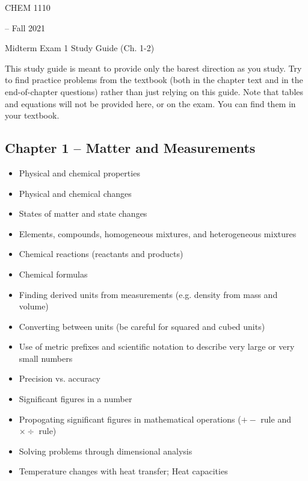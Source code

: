 \documentclass[12pt, letterpaper]{memoir}
\begin{document}
	\mainmatter
	
	\begin{center}
		{\Huge CHEM 1110}
		{\LARGE-- Fall 2021
		
		Midterm Exam 1 Study Guide (Ch. 1-2)}
	\end{center}
	
	This study guide is meant to provide only the barest direction as you study. Try to find practice problems from the textbook (both in the chapter text and in the end-of-chapter questions) rather than just relying on this guide. Note that tables and equations will not be provided here, or on the exam. You can find them in your textbook.
	

	\subsection*{Chapter 1 -- Matter and Measurements}
	\begin{itemize}
		\item Physical and chemical properties
		\item Physical and chemical changes
		\item States of matter and state changes
		\item Elements, compounds, homogeneous mixtures, and heterogeneous mixtures
		\item Chemical reactions (reactants and products)
		\item Chemical formulas
		\item Finding derived units from measurements (e.g. density from mass and volume)
		\item Converting between units (be careful for squared and cubed units)
		\item Use of metric prefixes and scientific notation to describe very large or very small numbers
		\item Precision vs. accuracy
		\item Significant figures in a number
		\item Propogating significant figures in mathematical operations ($+-$ rule and $\times \div$ rule)
		\item Solving problems through dimensional analysis
		\item Temperature changes with heat transfer; Heat capacities
	\end{itemize}
\end{document}
